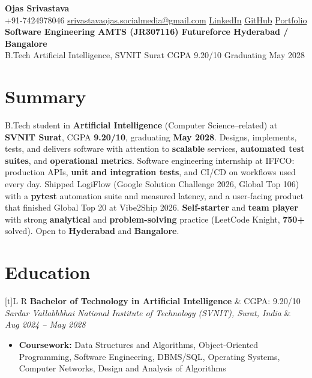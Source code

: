 \documentclass[a4paper,10pt]{article}
\newcommand{\resumeSubheading}[4]{%
  \vspace{0.4mm}
  \noindent
  \begin{tabularx}{\textwidth}[t]{L R}
    \textbf{#1} & #4 \\
    \textit{#3} & \textit{#2} \\
  \end{tabularx}
  \vspace{-0.4mm}%
}
\begin{document}
\selectfont

\begin{center}
  {\LARGE \textbf{Ojas Srivastava}} \\[0.8mm]
  \small
  +91-7424978046 \textbar{}
  \href{mailto:srivastavaojas.socialmedia@gmail.com}{srivastavaojas.socialmedia@gmail.com} \textbar{}
  \href{https://linkedin.com/in/ojas-srivastava05}{LinkedIn} \textbar{}
  \href{https://github.com/Ojas-Srivastava05}{GitHub} \textbar{}
  \href{https://ojas-srivastava.vercel.app}{Portfolio} \\[0.4mm]
  \textbf{Software Engineering AMTS (JR307116) \textbar{} Futureforce \textbar{} Hyderabad / Bangalore} \\[0.2mm]
  B.Tech Artificial Intelligence, SVNIT Surat \textbar{} CGPA 9.20/10 \textbar{} Graduating May 2028
\end{center}

\vspace{-0.8mm}

\section{Summary}
\small
B.Tech student in \textbf{Artificial Intelligence} (Computer Science--related) at \textbf{SVNIT Surat}, CGPA \textbf{9.20/10}, graduating \textbf{May 2028}. Designs, implements, tests, and delivers software with attention to \textbf{scalable} services, \textbf{automated test suites}, and \textbf{operational metrics}. Software engineering internship at IFFCO: production APIs, \textbf{unit and integration tests}, and CI/CD on workflows used every day. Shipped LogiFlow (Google Solution Challenge 2026, Global Top 106) with a \textbf{pytest} automation suite and measured latency, and a user-facing product that finished Global Top 20 at Vibe2Ship 2026. \textbf{Self-starter} and \textbf{team player} with strong \textbf{analytical} and \textbf{problem-solving} practice (LeetCode Knight, \textbf{750+} solved). Open to \textbf{Hyderabad} and \textbf{Bangalore}.

\section{Education}
\small
\resumeSubheading
  {Bachelor of Technology in Artificial Intelligence}{Aug 2024 -- May 2028}
  {Sardar Vallabhbhai National Institute of Technology (SVNIT), Surat, India}{CGPA: 9.20/10}
\begin{itemize}
  \item \textbf{Coursework:} Data Structures and Algorithms, Object-Oriented Programming, Software Engineering, DBMS/SQL, Operating Systems, Computer Networks, Design and Analysis of Algorithms
\end{itemize}
\end{document}

